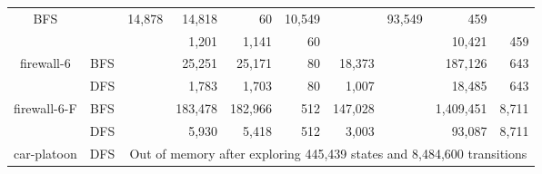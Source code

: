 \begin{table}[t]
\begin{tabular}{c|c|rrrrr|rrr}
BFS & \multirow{2}{*}{} & 14,878 & 14,818 & 60 & 10,549 & \multirow{2}{*}{} &
93,549 & 459 \\
& DFS & & 1,201 & 1,141 & 60 & 654 & & 10,421 & 459 \\
\hline
\multirow{2}{*}{firewall-6} &
BFS & \multirow{2}{*}{} & 25,251 & 25,171 & 80 & 18,373 & \multirow{2}{*}{} &
187,126 & 643 \\
& DFS & & 1,783 & 1,703 & 80 & 1,007 & & 18,485 & 643 \\
\hline
\multirow{2}{*}{firewall-6-F} &
BFS & \multirow{2}{*}{} & 183,478 & 182,966 & 512 & 147,028 & \multirow{2}{*}{}
& 1,409,451 & 8,711 \\
& DFS & & 5,930 & 5,418 & 512 & 3,003 & & 93,087 & 8,711 \\
\hline
car-platoon & DFS & \multicolumn{8}{|c}{Out of memory after exploring 445,439
states and 8,484,600 transitions} \\
\hline
\end{tabular}
\end{table}

